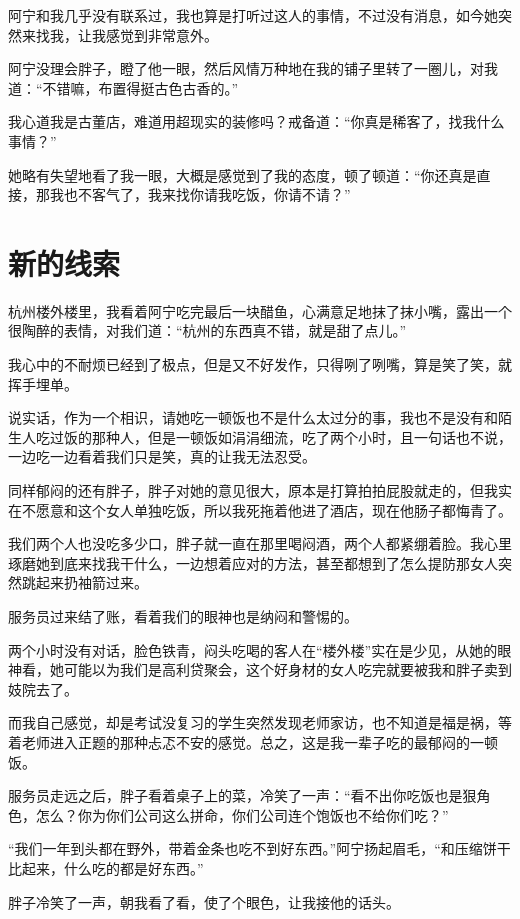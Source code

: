 阿宁和我几乎没有联系过，我也算是打听过这人的事情，不过没有消息，如今她突然来找我，让我感觉到非常意外。

阿宁没理会胖子，瞪了他一眼，然后风情万种地在我的铺子里转了一圈儿，对我道：“不错嘛，布置得挺古色古香的。”

我心道我是古董店，难道用超现实的装修吗？戒备道：“你真是稀客了，找我什么事情？”

她略有失望地看了我一眼，大概是感觉到了我的态度，顿了顿道：“你还真是直接，那我也不客气了，我来找你请我吃饭，你请不请？”

\chapter{新的线索}

杭州楼外楼里，我看着阿宁吃完最后一块醋鱼，心满意足地抹了抹小嘴，露出一个很陶醉的表情，对我们道：“杭州的东西真不错，就是甜了点儿。”

我心中的不耐烦已经到了极点，但是又不好发作，只得咧了咧嘴，算是笑了笑，就挥手埋单。

说实话，作为一个相识，请她吃一顿饭也不是什么太过分的事，我也不是没有和陌生人吃过饭的那种人，但是一顿饭如涓涓细流，吃了两个小时，且一句话也不说，一边吃一边看着我们只是笑，真的让我无法忍受。

同样郁闷的还有胖子，胖子对她的意见很大，原本是打算拍拍屁股就走的，但我实在不愿意和这个女人单独吃饭，所以我死拖着他进了酒店，现在他肠子都悔青了。

我们两个人也没吃多少口，胖子就一直在那里喝闷酒，两个人都紧绷着脸。我心里琢磨她到底来找我干什么，一边想着应对的方法，甚至都想到了怎么提防那女人突然跳起来扔袖箭过来。

服务员过来结了账，看着我们的眼神也是纳闷和警惕的。

两个小时没有对话，脸色铁青，闷头吃喝的客人在“楼外楼”实在是少见，从她的眼神看，她可能以为我们是高利贷聚会，这个好身材的女人吃完就要被我和胖子卖到妓院去了。

而我自己感觉，却是考试没复习的学生突然发现老师家访，也不知道是福是祸，等着老师进入正题的那种忐忑不安的感觉。总之，这是我一辈子吃的最郁闷的一顿饭。

服务员走远之后，胖子看着桌子上的菜，冷笑了一声：“看不出你吃饭也是狠角色，怎么？你为你们公司这么拼命，你们公司连个饱饭也不给你们吃？”

“我们一年到头都在野外，带着金条也吃不到好东西。”阿宁扬起眉毛，“和压缩饼干比起来，什么吃的都是好东西。”

胖子冷笑了一声，朝我看了看，使了个眼色，让我接他的话头。

